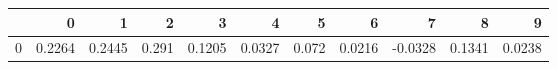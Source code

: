 \begin{tabular}{lrrrrrrrrrr}
\toprule
{} &       0 &       1 &      2 &       3 &       4 &      5 &       6 &       7 &       8 &       9 \\
\midrule
0 &  0.2264 &  0.2445 &  0.291 &  0.1205 &  0.0327 &  0.072 &  0.0216 & -0.0328 &  0.1341 &  0.0238 \\
\bottomrule
\end{tabular}
